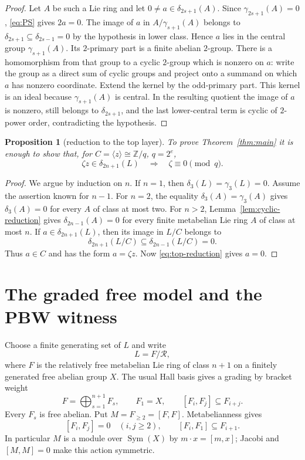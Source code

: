\documentclass[11pt]{amsart}
\newtheorem{proposition}[theorem]{Proposition}
\theoremstyle{remark}
\newcommand{\Z}{\mathbb Z}
\newcommand{\Sym}{\operatorname{Sym}}
\newcommand{\gm}{\gamma}
\newcommand{\Rel}{\mathcal R}
\begin{document}
\begin{proof}
Let $A$ be such a Lie ring and let $0\ne a\in\delta_{2s+1}(A)$.
Since $\gm_{2s+1}(A)=0$, \eqref{eq:PS} gives $2a=0$.  The image of
$a$ in $A/\gm_{s+1}(A)$ belongs to
$\delta_{2s+1}\subseteq\delta_{2s-1}=0$ by the hypothesis in lower
class.  Hence $a$ lies in the central group $\gm_{s+1}(A)$.  Its
$2$-primary part is a finite abelian $2$-group.
There is a homomorphism from that group to a cyclic $2$-group which is
nonzero on $a$: write the group as a direct sum of cyclic groups and
project onto a summand on which $a$ has nonzero coordinate.  Extend
the kernel by the odd-primary part.  This kernel is an ideal because
$\gm_{s+1}(A)$ is central.  In the resulting quotient the image of
$a$ is nonzero, still belongs to $\delta_{2s+1}$, and the last
lower-central term is cyclic of $2$-power order, contradicting the
hypothesis.
\end{proof}

\begin{proposition}[reduction to the top layer]\label{prop:top-reduction}
To prove Theorem~\ref{thm:main} it is enough to show that, for
$C=\langle z\rangle\cong\Z/q$, $q=2^e$,
\begin{equation}\label{eq:top-reduction}
 \zeta z\in\delta_{2n+1}(L)
 \quad\Longrightarrow\quad
 \zeta\equiv0\pmod q.
\end{equation}
\end{proposition}

\begin{proof}
We argue by induction on $n$.  If $n=1$, then
$\delta_3(L)=\gm_3(L)=0$.  Assume the assertion known for $n-1$.
For $n=2$, the equality $\delta_3(A)=\gm_3(A)$ gives
$\delta_3(A)=0$ for every $A$ of class at most two.  For $n>2$,
Lemma~\ref{lem:cyclic-reduction} gives
$\delta_{2n-1}(A)=0$ for every finite metabelian Lie ring $A$ of
class at most $n$.  If $a\in\delta_{2n+1}(L)$, then its image in
$L/C$ belongs to
\[
 \delta_{2n+1}(L/C)\subseteq\delta_{2n-1}(L/C)=0.
\]
Thus $a\in C$ and has the form $a=\zeta z$.  Now
\eqref{eq:top-reduction} gives $a=0$.
\end{proof}

\section{The graded free model and the PBW witness}

Choose a finite generating set of $L$ and write
\[
                         L=F/\Rel,
\]
where $F$ is the relatively free metabelian Lie ring of class
$n+1$ on a finitely generated free abelian group $X$.  The usual Hall
basis gives a grading by bracket weight
\[
 F=\bigoplus_{s=1}^{n+1}F_s,
 \qquad F_1=X,
 \qquad [F_i,F_j]\subseteq F_{i+j}.
\]
Every $F_s$ is free abelian.  Put $M=F_{\geq2}=[F,F]$.  Metabelianness
gives
\begin{equation}\label{eq:metabelian-grading}
 [F_i,F_j]=0\quad(i,j\geq2),
 \qquad
 [F_i,F_1]\subseteq F_{i+1}.
\end{equation}
In particular $M$ is a module over $\Sym(X)$ by
$m\cdot x=[m,x]$; Jacobi and $[M,M]=0$ make this action symmetric.
\end{document}
